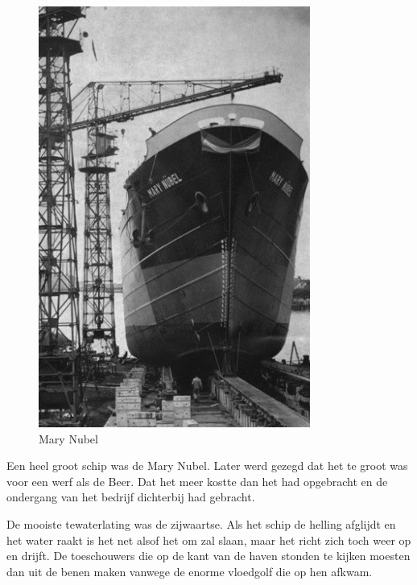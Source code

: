 \documentclass[12pt,twoside, openright]{memoir}
\begin{document}
\begin{figure}
\includegraphics[width=\textwidth]{img/ch15/schuttevaer12}
\caption*{\footnotesize Mary Nubel}
\end{figure}

Een heel groot schip was de Mary Nubel. Later werd gezegd dat het te groot was voor een werf als de Beer. Dat het meer kostte dan het had opgebracht en de ondergang van het bedrijf dichterbij had gebracht. 

De mooiste tewaterlating was de zijwaartse. Als het schip de helling afglijdt en het water raakt is het net alsof het om zal slaan, maar het richt zich toch weer op en drijft. De toeschouwers die op de kant van de haven stonden te kijken moesten dan uit de benen maken vanwege de enorme vloedgolf die op hen afkwam.
\end{document}
